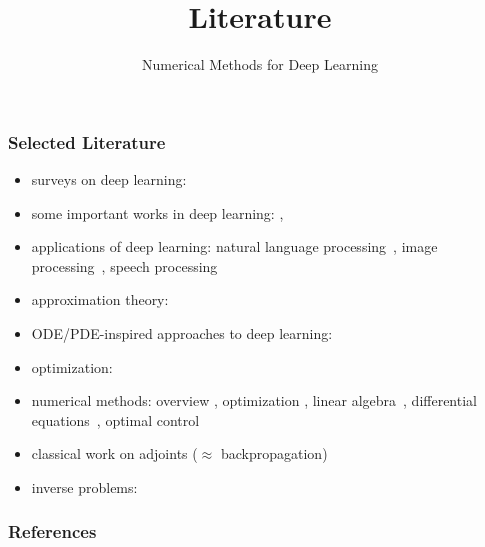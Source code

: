 \documentclass[12pt,fleqn]{beamer}
\title[Literature]{Literature}
\subtitle{Numerical Methods for Deep Learning}
\date{}
\begin{document}
\makebeamertitle

\begin{frame}
	\frametitle{Selected Literature}
	
	\begin{itemize}
		\item surveys on deep learning: \cite{bengio2009learning,lecun2015deep}
		\item some important works in deep learning: \cite{Rosenblatt1958,Rumelhart1986,LeCun1990,HuangEtAl2006,RainaEtAl2009,KrizhevskySutskeverHinton2012,IoffeSzegedy2015,he2016deep,he2016identity,UlyanovEtAl2016,LiEtAl2017},
		\item applications of deep learning: natural language processing~\cite{CollobertEtAl2011,BordesEtAl2014,JeanEtAl2014}, image processing~\cite{LeCun1990,KrizhevskySutskeverHinton2012}, speech processing~\cite{hinton2012deep}
		\item approximation theory: \cite{Cybenko1989,HornikEtAl1989}
		\item ODE/PDE-inspired approaches to deep learning: \cite{E2017, HaberRuthotto2017,ChangEtAl2017Reversible,RuthottoHaber2018}
		\item optimization: ~\cite{RobbinsMonro1951,GoPe1973,GoPe03,OLearyRust2013,Bottou2012,Bertsekas2015,bottou2016optimization,Onken2020DO,NewmanEtAl2020}
		\item numerical methods: overview \cite{AscherGreif2011}, optimization \cite{NocedalWright2006,BoydVandenberghe2004,Beck2014}, linear algebra~\cite{Saad2003,HansenNagyOLeary2006}, differential equations~\cite{AscherPetzold1998,Ascher2010}, optimal control~\cite{BorzSchulz2012}
		\item classical work on adjoints ($\approx$ backpropagation) \cite{bliss1919}
		\item inverse problems: \cite{Hansen1998,Vogel2002,Hansen2010}
	\end{itemize}
\end{frame}


\begin{frame}[allowframebreaks]
	\frametitle{References}
 


\end{frame}
\end{document}
